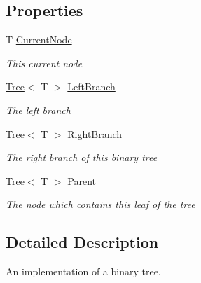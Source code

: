 \subsection*{Properties}
\begin{DoxyCompactItemize}
\item 
T \hyperlink{classHumDrum_1_1Structures_1_1Tree_af2d1d062002b9ffbb3587f69f2b03175}{Current\+Node}
\begin{DoxyCompactList}\small\item\em This current node \end{DoxyCompactList}\item 
\hyperlink{classHumDrum_1_1Structures_1_1Tree}{Tree}$<$ T $>$ \hyperlink{classHumDrum_1_1Structures_1_1Tree_a713658d58f7222e2b3de4878f74abcf2}{Left\+Branch}
\begin{DoxyCompactList}\small\item\em The left branch \end{DoxyCompactList}\item 
\hyperlink{classHumDrum_1_1Structures_1_1Tree}{Tree}$<$ T $>$ \hyperlink{classHumDrum_1_1Structures_1_1Tree_a2b0d1d71d45216c34d14479b04a6c7a8}{Right\+Branch}
\begin{DoxyCompactList}\small\item\em The right branch of this binary tree \end{DoxyCompactList}\item 
\hyperlink{classHumDrum_1_1Structures_1_1Tree}{Tree}$<$ T $>$ \hyperlink{classHumDrum_1_1Structures_1_1Tree_ab9c1b5646424bc2926a944a64bd952c2}{Parent}
\begin{DoxyCompactList}\small\item\em The node which contains this leaf of the tree \end{DoxyCompactList}\end{DoxyCompactItemize}


\subsection{Detailed Description}
An implementation of a binary tree. 



